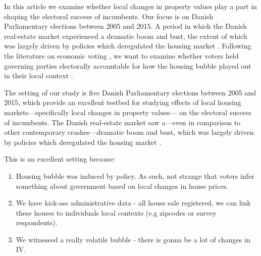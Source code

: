 \documentclass[12pt,a4paper]{article}
\begin{document}

In this article we examine whether local changes in property values play a part in shaping the electoral success of incumbents. Our focus is on Danish Parliamentary elections between 2005 and 2015. A period in which the Danish real-estate market  experienced a dramatic boom and bust, the extent of which was largely driven by policies which deregulated the housing market \citep{dam2011housing}. Following the literature on economic voting \citep{healy2013retrospective,lewis2013vp}, we want to examine whether voters held governing parties electorally accountable for how the housing bubble played out in their local context . 

The setting of our study is five Danish Parliamentary elections between 2005 and 2015, which provide an excellent testbed for studying effects of local housing markets—specifically local changes in property values— on the electoral success of incumbents. The Danish real-estate market saw a—even in comparison to other contemporary crashes—dramatic boom and bust, which was largely driven by policies which deregulated the housing market \citep{dam2011housing}. 

This is an excellent setting because: 

\begin{enumerate}
	\item Housing bubble was induced by policy. As such, not strange that voters infer something about government based on local changes in house prices.
	\item We have kick-ass administrative data - all house sale registered, we can link these houses to individuals local contexts (e.g zipcodes or survey respondents).
	\item We witnessed a really volatile bubble - there is gonna be a lot of changes in IV.
\end{enumerate}




\end{document}
